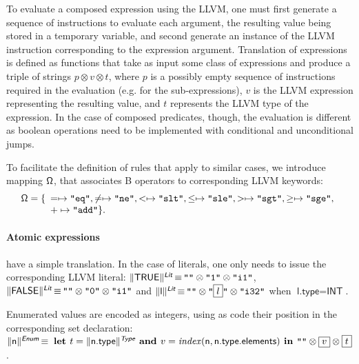 \documentclass{llncs}
\newcommand{\trad}[2]{\ensuremath{\lVert \textsf{#1} \rVert^{\textit{#2}}}}
\DeclareMathOperator{\isdef}{\equiv}
\newcommand{\llvm}[1]{\texttt{#1}}
\newcommand{\B}[1]{\textsf{#1}}
\newcommand{\LET}[0]{\textbf{ let }}
\newcommand{\IN}[0]{\textbf{ in }}
\newcommand{\AND}[0]{\textbf{ and }}
\newcommand{\PH}[1]{\framebox{$#1$}}
\newcommand{\sep}[0]{\otimes}
\newcommand{\opmap}[0]{\ensuremath{\sf\Omega}}
\begin{document}
To evaluate a composed expression using the LLVM, one must first generate a
sequence of instructions to evaluate each argument, the resulting value being
stored in a temporary variable, and second generate an instance of the LLVM
instruction corresponding to the expression argument.  Translation of
expressions is defined as functions that take as input some class of expressions
and produce a triple of strings $p \sep v \sep t$, where $p$ is a possibly empty
sequence of instructions required in the evaluation (e.g.  for the
sub-expressions), $v$ is the LLVM expression representing the resulting value,
and $t$ represents the LLVM type of the expression. In the case of composed
predicates, though, the evaluation is different as boolean operations need to be
implemented with conditional and unconditional jumps.

To facilitate the definition of rules that apply to similar cases, we introduce
mapping $\opmap$, that associates B operators to corresponding LLVM keywords:
$$\opmap = \{
\begin{array}[t]{l}
  = \mapsto \llvm{"eq"},
  \ne \mapsto \llvm{"ne"},
  < \mapsto \llvm{"slt"},
  \le \mapsto \llvm{"sle"},
  > \mapsto \llvm{"sgt"},
  \ge \mapsto \llvm{"sge"}, \\
  + \mapsto \llvm{"add"} \}.
  \end{array}
$$

\paragraph{Atomic expressions} have a simple translation. In the case of
literals, one only needs to issue the corresponding LLVM literal:
$\trad{TRUE}{\B{Lit}} \isdef \llvm{""} \sep \llvm{"1"} \sep \llvm{"i1"}$,
$\trad{FALSE}{\B{Lit}} \isdef \llvm{""} \sep \llvm{"0"} \sep \llvm{"i1"}$ and
$\trad{l}{\B{Lit}} \isdef \llvm{""} \sep \llvm{"\PH{l}"} \sep \llvm{"i32"}$ when
$\B{l.type} = \B{INT}$.

Enumerated values are encoded as integers, using as code their position in the
corresponding set declaration: $\trad{\B{n}}{\B{Enum}} \isdef \LET t =
\trad{\B{n.type}}{\B{Type}} \AND v = \mathit{index}(\B{n}, \B{n.type.elements})
\IN \llvm{""} \sep \PH{v} \sep \PH{t}$.
\end{document}
